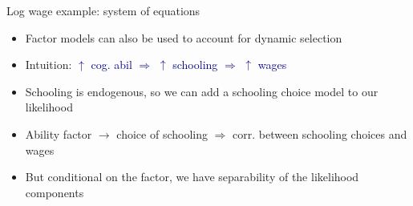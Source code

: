 \documentclass[aspectratio=169]{beamer}
\begin{document}
\begin{frame}

Log wage example: system of equations
\bigskip

\end{frame}




\begin{frame}

\begin{itemize}
\itemsep1.5em
\item<1-> Factor models can also be used to account for dynamic selection
\item<2-> Intuition: \textcolor{navy}{$\uparrow$ cog. abil $\Rightarrow \,\,\uparrow$ schooling $\Rightarrow \,\,\uparrow$ wages}
\item<3-> Schooling is endogenous, so we can add a schooling choice model to our likelihood
\item<4-> Ability factor $\to$ choice of schooling $\Rightarrow$ corr. between schooling choices and wages
\item<5-> But conditional on the factor, we have separability of the likelihood components
\end{itemize}


\end{frame}
\end{document}
